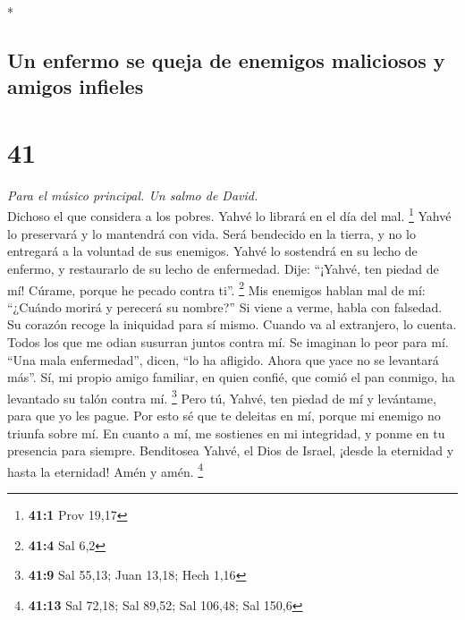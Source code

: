 \begin{paracol}{2}
\begin{otherlanguage}{english}
\end{otherlanguage}

\switchcolumn[0]*

\hypertarget{un-enfermo-se-queja-de-enemigos-maliciosos-y-amigos-infieles}{%
\subsection{Un enfermo se queja de enemigos maliciosos y amigos
infieles}\label{un-enfermo-se-queja-de-enemigos-maliciosos-y-amigos-infieles}}

\hypertarget{section-80}{%
\section{41}\label{section-80}}

\emph{Para el músico principal. Un salmo de David.}\\
 Dichoso el que considera a los pobres. Yahvé lo librará
en el día del mal. \footnote{\textbf{41:1} Prov 19,17} 
Yahvé lo preservará y lo mantendrá con vida. Será bendecido en la
tierra, y no lo entregará a la voluntad de sus enemigos. 
Yahvé lo sostendrá en su lecho de enfermo, y restaurarlo de su lecho de
enfermedad.  Dije: ``¡Yahvé, ten piedad de mí! Cúrame,
porque he pecado contra ti''. \footnote{\textbf{41:4} Sal 6,2}
 Mis enemigos hablan mal de mí: ``¿Cuándo morirá y
perecerá su nombre?''  Si viene a verme, habla con
falsedad. Su corazón recoge la iniquidad para sí mismo. Cuando va al
extranjero, lo cuenta.  Todos los que me odian susurran
juntos contra mí. Se imaginan lo peor para mí.  ``Una mala
enfermedad'', dicen, ``lo ha afligido. Ahora que yace no se levantará
más''.  Sí, mi propio amigo familiar, en quien confié, que
comió el pan conmigo, ha levantado su talón contra mí. \footnote{\textbf{41:9}
  Sal 55,13; Juan 13,18; Hech 1,16}  Pero tú, Yahvé, ten
piedad de mí y levántame, para que yo les pague.  Por
esto sé que te deleitas en mí, porque mi enemigo no triunfa sobre mí.
 En cuanto a mí, me sostienes en mi integridad, y ponme
en tu presencia para siempre.  Benditosea Yahvé, el Dios
de Israel, ¡desde la eternidad y hasta la eternidad! Amén y amén.
\footnote{\textbf{41:13} Sal 72,18; Sal 89,52; Sal 106,48; Sal 150,6}

\switchcolumn
\begin{otherlanguage}{english}


\end{otherlanguage}
\end{paracol}
